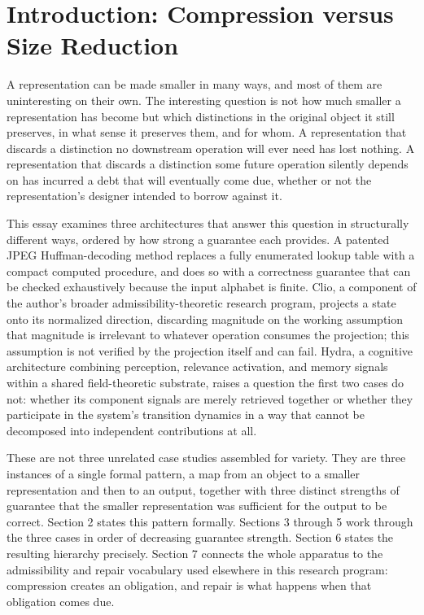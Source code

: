 \documentclass[11pt]{article}
\begin{document}
\section{Introduction: Compression versus Size Reduction}

A representation can be made smaller in many ways, and most of them are uninteresting on their own. The interesting question is not how much smaller a representation has become but which distinctions in the original object it still preserves, in what sense it preserves them, and for whom. A representation that discards a distinction no downstream operation will ever need has lost nothing. A representation that discards a distinction some future operation silently depends on has incurred a debt that will eventually come due, whether or not the representation's designer intended to borrow against it.

This essay examines three architectures that answer this question in structurally different ways, ordered by how strong a guarantee each provides. A patented JPEG Huffman-decoding method replaces a fully enumerated lookup table with a compact computed procedure, and does so with a correctness guarantee that can be checked exhaustively because the input alphabet is finite. Clio, a component of the author's broader admissibility-theoretic research program, projects a state onto its normalized direction, discarding magnitude on the working assumption that magnitude is irrelevant to whatever operation consumes the projection; this assumption is not verified by the projection itself and can fail. Hydra, a cognitive architecture combining perception, relevance activation, and memory signals within a shared field-theoretic substrate, raises a question the first two cases do not: whether its component signals are merely retrieved together or whether they participate in the system's transition dynamics in a way that cannot be decomposed into independent contributions at all.

These are not three unrelated case studies assembled for variety. They are three instances of a single formal pattern, a map from an object to a smaller representation and then to an output, together with three distinct strengths of guarantee that the smaller representation was sufficient for the output to be correct. Section 2 states this pattern formally. Sections 3 through 5 work through the three cases in order of decreasing guarantee strength. Section 6 states the resulting hierarchy precisely. Section 7 connects the whole apparatus to the admissibility and repair vocabulary used elsewhere in this research program: compression creates an obligation, and repair is what happens when that obligation comes due.
\end{document}
